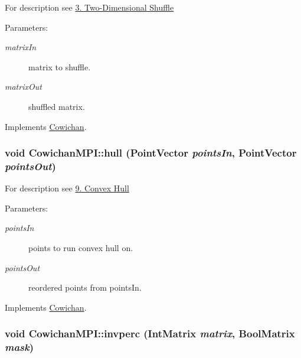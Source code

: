For description see \hyperlink{index_half_sec}{3. Two-Dimensional Shuffle} \begin{Desc}
\item[Parameters:]
\begin{description}
\item[{\em matrixIn}]matrix to shuffle. \item[{\em matrixOut}]shuffled matrix. \end{description}
\end{Desc}


Implements \hyperlink{class_cowichan_308603053675bccbe631f04af921f57c}{Cowichan}.\hypertarget{class_cowichan_m_p_i_22b3dce35fd93635bd4c1596e7fb839c}{
\subsubsection[{hull}]{\setlength{\rightskip}{0pt plus 5cm}void CowichanMPI::hull ({\bf PointVector} {\em pointsIn}, \/  {\bf PointVector} {\em pointsOut})}}
\label{class_cowichan_m_p_i_22b3dce35fd93635bd4c1596e7fb839c}


For description see \hyperlink{index_hull_sec}{9. Convex Hull} \begin{Desc}
\item[Parameters:]
\begin{description}
\item[{\em pointsIn}]points to run convex hull on. \item[{\em pointsOut}]reordered points from pointsIn. \end{description}
\end{Desc}


Implements \hyperlink{class_cowichan_0c6b68ae3c059b66893405f8530a2e0a}{Cowichan}.\hypertarget{class_cowichan_m_p_i_bcd0f18fcccc8973ddaacf4dda190b53}{
\subsubsection[{invperc}]{\setlength{\rightskip}{0pt plus 5cm}void CowichanMPI::invperc ({\bf IntMatrix} {\em matrix}, \/  {\bf BoolMatrix} {\em mask})}}
\label{class_cowichan_m_p_i_bcd0f18fcccc8973ddaacf4dda190b53}


